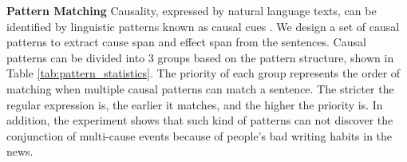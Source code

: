 \textbf{Pattern Matching}
Causality, expressed by natural language texts, can be identified by linguistic patterns known as causal cues \cite{Chang2005}.
We design a set of causal patterns to extract cause span and effect span from the sentences. Causal patterns can be divided into 3 groups based on the pattern structure, shown in Table \ref{tab:pattern_statistics}. The priority of each group represents the order of matching when multiple causal patterns can match a sentence. The stricter the regular expression is, the earlier it matches, and the higher the priority is. In addition, the experiment shows that such kind of patterns can not discover the conjunction of multi-cause events because of people's bad writing habits in the news. 
%
%




